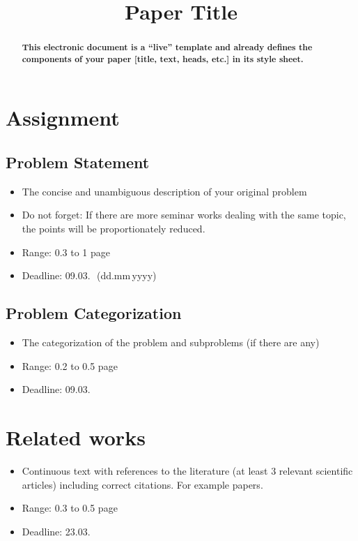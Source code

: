 \documentclass[onecolumn, conference]{IEEEtran}
\newcommand{\firstDeadline}{Deadline: 09.03.\,\the\year}
\newcommand{\secondDeadline}{Deadline: 23.03.\,\the\year}
\newcommand{\range}[2][0]{Range: #1 to #2 page}
\newcommand{\conciseItem}{\itemsep1pt \parskip0pt \parsep0pt}
\begin{document}
%
\title{Paper Title}


\author{
}

\maketitle
\begin{abstract}
\bf
This electronic document is a ``live'' template and already defines the components of your paper [title, text, heads, etc.] in its style sheet.
\end{abstract}


\section{Assignment}
\subsection{Problem Statement}
\begin{itemize}
	\conciseItem
	\item The concise and unambiguous description of your original problem
	\item Do not forget: If there are more seminar works dealing with the same topic, the points will be proportionately reduced.
	\item \range[0.3]{1}
	\item \firstDeadline~(dd.mm\,yyyy)
\end{itemize}
\subsection{Problem Categorization}
\begin{itemize}
	\conciseItem
	\item The categorization of the problem and subproblems (if there are any)
	\item \range[0.2]{0.5}
	\item \firstDeadline
\end{itemize}

\section{Related works}
\begin{itemize}
	\conciseItem
	\item Continuous text with references to the literature (at least 3 relevant scientific articles) including correct citations. For example papers\cite{RW:Eason, RW:Clerk, RW:Jacobs, RW:Elissa, RW:Nicole}.
	\item \range[0.3]{0.5}
	\item \secondDeadline
\end{itemize}
\end{document}

